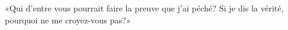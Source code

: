 \encetemps \jesusfoulejuifs
	«Qui d’entre vous pourrait faire la preuve que j’ai péché?
	Si je dis la vérité, pourquoi ne me croyez-vous pas?»
